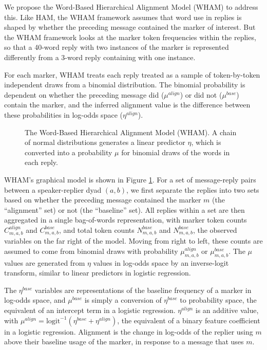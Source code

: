 \documentclass[11pt]{article}
\begin{document}
We propose the Word-Based Hierarchical Alignment Model (WHAM) to address this. Like HAM, the WHAM framework assumes that word use in replies is shaped by whether the preceding message contained the marker of interest. But the WHAM framework looks at the marker token frequencies within the replies, so that a 40-word reply with two instances of the marker is represented differently from a 3-word reply containing with one instance.

For each marker, WHAM treats each reply treated as a sample of token-by-token independent draws from a binomial distribution. The binomial probability is dependent on whether the preceding message did ($\mu^{align}$) or did not ($\mu^{base}$) contain the marker, and the inferred alignment value is the difference between these probabilities in log-odds space ($\eta^{align}$). 

\begin{figure}[t]
  \begin{center}
    
  \end{center}
  \caption{The Word-Based Hierarchical Alignment Model (WHAM). A chain of normal distributions generates a linear predictor $\eta$, which is converted into a probability $\mu$ for binomial draws of the words in each reply.}\label{fig:wham}
\end{figure}

WHAM's graphical model is shown in Figure \ref{fig:wham}. For a set of message-reply pairs between a speaker-replier dyad $(a,b)$, we first separate the replies into two sets based on whether the preceding message contained the marker $m$ (the ``alignment'' set) or not (the ``baseline'' set). All replies within a set are then aggregated in a single bag-of-words representation, with marker token counts $C^{align}_{m,a,b}$ and $C^{base}_{m,a,b}$, and total token counts $N^{base}_{m,a,b}$ and $N^{base}_{m,a,b}$, the observed variables on the far right of the model.  Moving from right to left, these counts are assumed to come from binomial draws with probability $\mu^{align}_{m,a,b}$ or $\mu^{base}_{m,a,b}$.  The $\mu$ values are generated from $\eta$ values in log-odds space by an inverse-logit transform, similar to linear predictors in logistic regression.

The $\eta^{base}$ variables are representations of the baseline frequency of a marker in log-odds space, and $\mu^{base}$ is simply a conversion of $\eta^{base}$ to probability space, the equivalent of an intercept term in a logistic regression. $\eta^{align}$ is an additive value, with $\mu^{align} = \textrm{logit}^{-1}(\eta^{base}+\eta^{align})$, the equivalent of a binary feature coefficient in a logistic regression.  Alignment is the change in log-odds of the replier using $m$ above their baseline usage of the marker, in response to a message that uses $m$.
\end{document}
